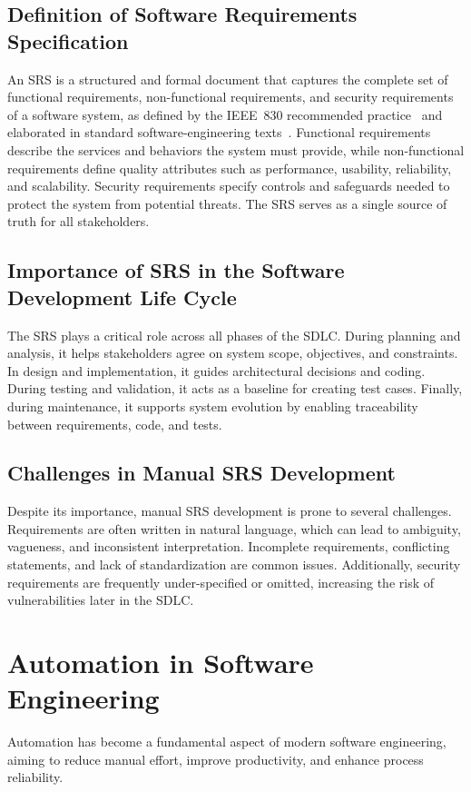 \documentclass[12pt,a4paper,oneside]{report}
\begin{document}
\subsection{Definition of Software Requirements Specification}
An SRS is a structured and formal document that captures the complete set of functional requirements, non-functional requirements, and security requirements of a software system, as defined by the IEEE~830 recommended practice~\cite{ref8} and elaborated in standard software-engineering texts~\cite{ref18,ref19}. Functional requirements describe the services and behaviors the system must provide, while non-functional requirements define quality attributes such as performance, usability, reliability, and scalability. Security requirements specify controls and safeguards needed to protect the system from potential threats. The SRS serves as a single source of truth for all stakeholders.

\subsection{Importance of SRS in the Software Development Life Cycle}
The SRS plays a critical role across all phases of the SDLC. During planning and analysis, it helps stakeholders agree on system scope, objectives, and constraints. In design and implementation, it guides architectural decisions and coding. During testing and validation, it acts as a baseline for creating test cases. Finally, during maintenance, it supports system evolution by enabling traceability between requirements, code, and tests.

\subsection{Challenges in Manual SRS Development}
Despite its importance, manual SRS development is prone to several challenges. Requirements are often written in natural language, which can lead to ambiguity, vagueness, and inconsistent interpretation. Incomplete requirements, conflicting statements, and lack of standardization are common issues. Additionally, security requirements are frequently under-specified or omitted, increasing the risk of vulnerabilities later in the SDLC.

\section{Automation in Software Engineering}
Automation has become a fundamental aspect of modern software engineering, aiming to reduce manual effort, improve productivity, and enhance process reliability.
\end{document}
